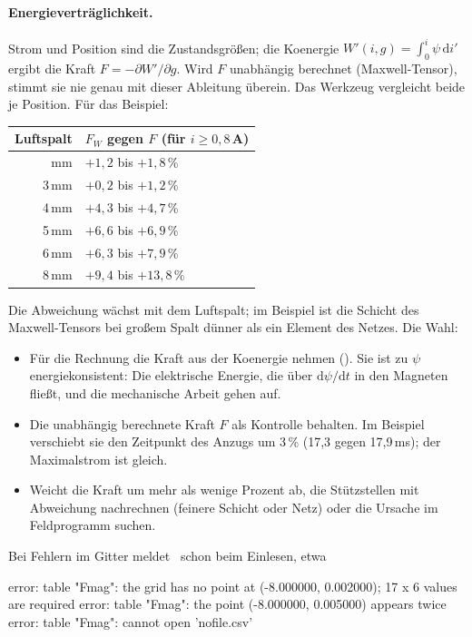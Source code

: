 \paragraph{Energieverträglichkeit.}
Strom und Position sind die Zustandsgrößen; die Koenergie
$W'(i,g)=\int_0^i\psi\,\mathrm{d}i'$ ergibt die Kraft
$F=-\partial W'/\partial g$. Wird $F$ unabhängig berechnet (Maxwell-Tensor),
stimmt sie nie genau mit dieser Ableitung überein. Das Werkzeug vergleicht beide
je Position. Für das Beispiel:

\begin{longtable}{@{}rl@{}}
  \toprule
  Luftspalt & $F_W$ gegen $F$ (für $i\ge0{,}8$\,A) \\
  \midrule
  \endhead
  \bottomrule
  \endfoot
  2\,mm & $+1{,}2$ bis $+1{,}8$\,\% \\
  3\,mm & $+0{,}2$ bis $+1{,}2$\,\% \\
  4\,mm & $+4{,}3$ bis $+4{,}7$\,\% \\
  5\,mm & $+6{,}6$ bis $+6{,}9$\,\% \\
  6\,mm & $+6{,}3$ bis $+7{,}9$\,\% \\
  8\,mm & $+9{,}4$ bis $+13{,}8$\,\% \\
\end{longtable}

Die Abweichung wächst mit dem Luftspalt; im Beispiel ist die Schicht des
Maxwell-Tensors bei großem Spalt dünner als ein Element des Netzes. Die Wahl:

\begin{itemize}
  \item Für die Rechnung die Kraft aus der Koenergie nehmen (). Sie
    ist zu $\psi$ energiekonsistent: Die elektrische Energie, die über
    $\mathrm{d}\psi/\mathrm{d}t$ in den Magneten fließt, und die mechanische
    Arbeit gehen auf.
  \item Die unabhängig berechnete Kraft $F$ als Kontrolle behalten. Im Beispiel
    verschiebt sie den Zeitpunkt des Anzugs um 3\,\% (17,3 gegen 17,9\,ms); der
    Maximalstrom ist gleich.
  \item Weicht die Kraft um mehr als wenige Prozent ab, die Stützstellen mit
    Abweichung nachrechnen (feinere Schicht oder Netz) oder die Ursache im
    Feldprogramm suchen.
\end{itemize}

Bei Fehlern im Gitter meldet \esim\ schon beim Einlesen, etwa

\begin{shell}
error: table "Fmag": the grid has no point at (-8.000000, 0.002000); 17 x 6 values are required
error: table "Fmag": the point (-8.000000, 0.005000) appears twice
error: table "Fmag": cannot open 'nofile.csv'
\end{shell}

